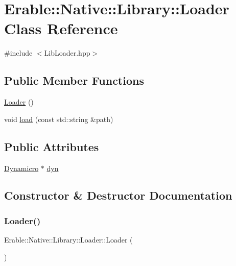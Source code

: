 \hypertarget{class_erable_1_1_native_1_1_library_1_1_loader}{}\section{Erable\+::Native\+::Library\+::Loader Class Reference}
\label{class_erable_1_1_native_1_1_library_1_1_loader}


{\ttfamily \#include $<$Lib\+Loader.\+hpp$>$}

\subsection*{Public Member Functions}
\begin{DoxyCompactItemize}
\item 
\mbox{\hyperlink{class_erable_1_1_native_1_1_library_1_1_loader_a3a8e72e9586daeb0c2c03a57a4fad14e}{Loader}} ()
\item 
void \mbox{\hyperlink{class_erable_1_1_native_1_1_library_1_1_loader_a6a8afe74acc286b176b007861c17c686}{load}} (const std\+::string \&path)
\end{DoxyCompactItemize}
\subsection*{Public Attributes}
\begin{DoxyCompactItemize}
\item 
\mbox{\hyperlink{class_dynamicro}{Dynamicro}} $\ast$ \mbox{\hyperlink{class_erable_1_1_native_1_1_library_1_1_loader_a98c28fbf70740dcc09d18752117aac68}{dyn}}
\end{DoxyCompactItemize}


\subsection{Constructor \& Destructor Documentation}
\mbox{\label{class_erable_1_1_native_1_1_library_1_1_loader_a3a8e72e9586daeb0c2c03a57a4fad14e}} 
\subsubsection{\texorpdfstring{Loader()}{Loader()}}
{\footnotesize\ttfamily Erable\+::\+Native\+::\+Library\+::\+Loader\+::\+Loader (\begin{DoxyParamCaption}{ }\end{DoxyParamCaption})}



